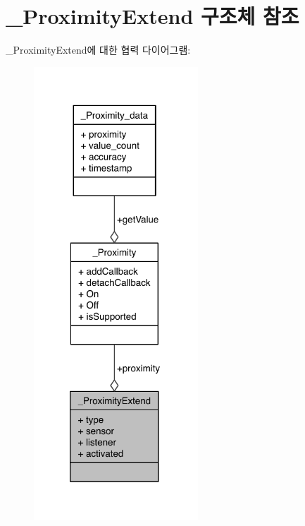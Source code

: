 \hypertarget{struct__ProximityExtend}{\section{\-\_\-\-Proximity\-Extend 구조체 참조}
\label{struct__ProximityExtend}
}


\-\_\-\-Proximity\-Extend에 대한 협력 다이어그램\-:\nopagebreak
\begin{figure}[H]
\begin{center}
\leavevmode
\includegraphics[width=175pt]{d6/dae/struct__ProximityExtend__coll__graph}
\end{center}
\end{figure}
